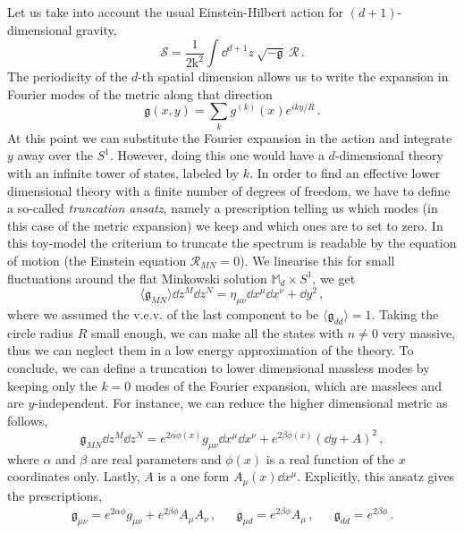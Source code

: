 \documentclass[debug]{phd}
\begin{document}
			Let us take into account the usual Einstein-Hilbert action for $(d+1)$-dimensional gravity,
					\begin{equation*}
						\mathcal{S} = \frac{1}{2 \mathrm{k}^2} \int \dd^{d+1}z\ \sqrt{-\mathfrak{g}}\ \mathcal{R} \, .
					\end{equation*}
			The periodicity of the $d$-th spatial dimension allows us to write the expansion in Fourier modes of the metric along that direction
					\begin{equation*}
						\mathfrak{g} (x, y) = \sum_{k} g^{(k)}(x) e^{i k y / R} \, .
					\end{equation*}
			At this point we can substitute the Fourier expansion in the action and integrate $y$ away over the $S^1$.
			However, doing this one would have a $d$-dimensional theory with an infinite tower of states, labeled by $k$.
			In order to find an effective lower dimensional theory with a finite number of degrees of freedom, we have to define a so-called \emph{truncation ansatz}, namely a prescription telling us which modes (in this case of the metric expansion) we keep and which ones are to set to zero.
			In this toy-model the criterium to truncate the spectrum is readable by the equation of motion (the Einstein equation $\mathcal{R}_{MN} = 0$).
			We linearise this for small fluctuations around the flat Minkowski solution $\mathbb{M}_{d} \times S^1$, we get
					\begin{equation*}
						\langle \mathfrak{g}_{MN} \rangle \dd z^M \dd z^N = \eta_{\mu\nu} \dd x^\mu \dd x^\nu + \dd y^2 \, , 
					\end{equation*}
			where we assumed the v.e.v. of the last component to be $\langle \mathfrak{g}_{dd} \rangle = 1$.
			Taking the circle radius $R$ small enough, we can make all the states with $n\neq 0$ very massive, thus we can neglect them in a low energy approximation of the theory.
			To conclude, we can define a truncation to lower dimensional massless modes by keeping  only the $k=0$ modes of the Fourier  expansion, which are masslees and 
			are $y$-independent.
			For instance, we can reduce the higher dimensional metric as follows,
					\begin{equation*}
						\mathfrak{g}_{MN} \dd z^M \dd z^N = e^{2\alpha \phi(x)} g_{\mu\nu} \dd x^\mu \dd x^\nu + e^{2\beta \phi(x)} (\dd y + A )^2\, ,
					\end{equation*}
			where $\alpha$ and $\beta$ are real parameters and $\phi(x)$ is a real function of the $x$ coordinates only. 
			Lastly, $A$ is a one form $A_{\mu}(x) \dd x^\mu$.
			Explicitly, this ansatz gives the prescriptions,
					\begin{align*}
						&& \mathfrak{g}_{\mu\nu} = e^{2\alpha \phi} g_{\mu\nu} + e^{2\beta \phi} A_{\mu} A_{\nu} \, , && \mathfrak{g}_{\mu d} = e^{2\beta \phi} A_{\mu} \, , & & \mathfrak{g}_{dd} = e^{2\beta\phi} \, . & &
					\end{align*}
			
\end{document}

